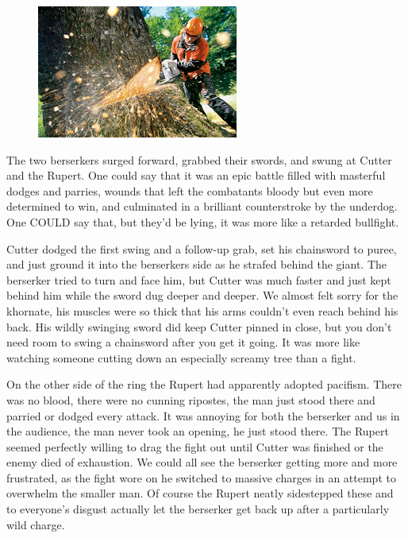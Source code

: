 \begin{figure}
	\begin{center}
		\includegraphics[width=\figwidth]{pics/6/34.png}
	\end{center}
\end{figure}
The two berserkers surged forward, grabbed their swords, and swung at Cutter and the Rupert. 
One could say that it was an epic battle filled with masterful dodges and parries, wounds that left the combatants bloody but even more determined to win, and culminated in a brilliant counterstroke by the underdog. 
One COULD say that, but they'd be lying, it was more like a retarded bullfight.

Cutter dodged the first swing and a follow-up grab, set his chainsword to puree, and just ground it into the berserkers side as he strafed behind the giant. 
The berserker tried to turn and face him, but Cutter was much faster and just kept behind him while the sword dug deeper and deeper. 
We almost felt sorry for the khornate, his muscles were so thick that his arms couldn't even reach behind his back. 
His wildly swinging sword did keep Cutter pinned in close, but you don't need room to swing a chainsword after you get it going. 
It was more like watching someone cutting down an especially screamy tree than a fight.

On the other side of the ring the Rupert had apparently adopted pacifism. 
There was no blood, there were no cunning ripostes, the man just stood there and parried or dodged every attack. 
It was annoying for both the berserker and us in the audience, the man never took an opening, he just stood there. 
The Rupert seemed perfectly willing to drag the fight out until Cutter was finished or the enemy died of exhaustion. 
We could all see the berserker getting more and more frustrated, as the fight wore on he switched to massive charges in an attempt to overwhelm the smaller man. 
Of course the Rupert neatly sidestepped these and to everyone's disgust actually let the berserker get back up after a particularly wild charge.

